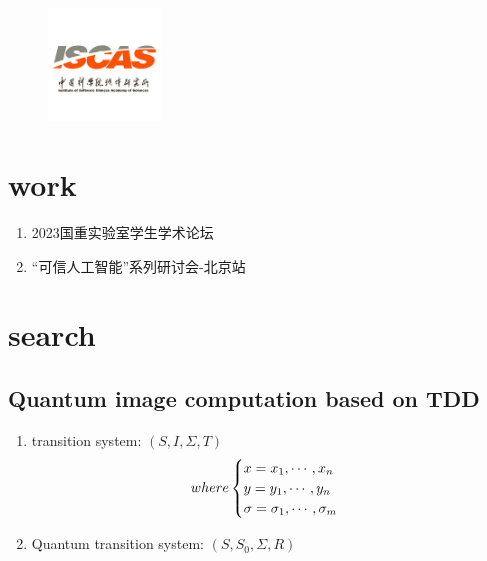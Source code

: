 \documentclass[aspectratio=1610,18pt]{ctexbeamer}
\title{}
\author{高丁超}
\begin{document}
\begin{frame}[plain]
  \titlepage
  \begin{figure}
    \centering
    \includegraphics[width=3cm]{iscas.png}
  \end{figure}
\end{frame}
\section{work}
\begin{frame}
  \begin{enumerate}
    \item 2023国重实验室学生学术论坛
    \item “可信人工智能”系列研讨会-北京站
  \end{enumerate}
\end{frame}
\section{search}
\subsection{Quantum image computation based on TDD}
\begin{frame}
  \begin{enumerate}
    \Large
    \item  transition system: $(S, I, \Sigma, T)$
    \begin{equation}
      where
      \begin{cases}
        x = x_1, \cdots, x_n\\
        y = y_1, \cdots, y_n\\
        \sigma = \sigma_1, \cdots, \sigma_m
      \end{cases}
      \notag
    \end{equation}
    \item Quantum transition system: $(S, S_0, \Sigma, R)$
  \end{enumerate}
\end{frame}
\end{document}
